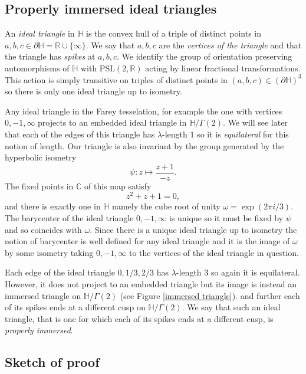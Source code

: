 \documentclass[12pt]{amsart}
\theoremstyle{plain}
\theoremstyle{definition}
\def\HH{\mathbb{H}}
\def\xx{\HH/g2}
\def\CC{\mathbb{C}}
\def\RR{\mathbb{R}}
\def\slr{\mathrm{PSL}(2, \RR)}
\def\g2{\Gamma(2)}
\def\xx{\HH/\g2}
\begin{document}
\subsection{Properly immersed ideal triangles}

An \textit{ideal triangle} in $\HH$  is the convex hull 
of a triple of distinct points in $a,b,c \in \partial \HH = \RR \cup \{ \infty \}$.
We say that $a,b,c$ are the \textit{vertices of the triangle}
and that the triangle has \textit{spikes} at $a,b,c$.
We identify the  group of orientation preserving automorphisms of $\HH$
 with $\slr$ acting by linear fractional transformations.
This action is simply transitive  on
triples of distinct points in $(a,b,c) \in (\partial \HH)^3$
so there is only one ideal triangle up to isometry.

Any  ideal triangle in the Farey tesselation, 
for example the one with vertices $0,-1,\infty$
projects to an embedded ideal triangle in $\xx$.
We will see later that each of the edges
of this triangle has $\lambda$-length $1$
so it is \textit{equilateral} for this notion of length.
Our triangle is also invariant by the group generated by the
hyperbolic isometry
$$ \psi: z \mapsto \frac{z+1}{-z  }.$$
The fixed points in $\CC$ of this map satisfy
$$z^2 + z + 1 = 0,$$
and there is exactly one in $\HH$ 
namely the cube root of unity $\omega= \exp(2\pi i/3)$.
The {barycenter} 
of the ideal triangle $0,-1,\infty$
is unique so it must be fixed by $\psi$ 
and so coincides with $\omega$.
Since there is a unique ideal triangle up to isometry 
the notion of barycenter is well defined for any ideal triangle and
it is the image of $\omega$ by some isometry taking $0,-1,\infty$ to
the vertices of the ideal triangle in question.


Each edge of the ideal triangle $0,1/3,2/3$
has $\lambda$-length $3$ 
so again it is equilateral.
However, it does not project to  an embedded triangle
but its image is instead an immersed triangle on $\xx$
(see Figure \ref{immersed triangle}).
and further each of its spikes ends at a different cusp on 
$\xx$.
We say that such an ideal triangle,
that is one for which 
each of its spikes ends at a different cusp,
is \textit{properly immersed}.


\subsection{Sketch of proof}
\end{document}

